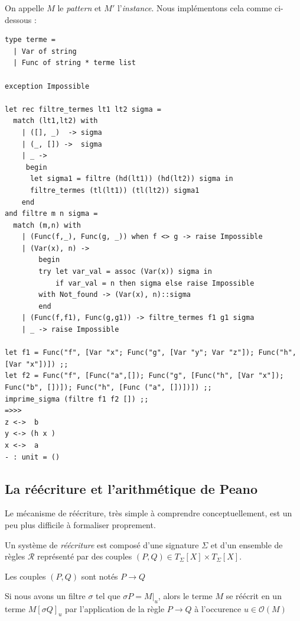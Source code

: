 \documentclass[11pt]{book}
\begin{document}
On appelle $M$ le \textit{pattern} et $M'$ l'\textit{instance}.
Nous implémentons cela comme ci-dessous :
\begin{Verbatim}
type terme = 
  | Var of string
  | Func of string * terme list

exception Impossible

let rec filtre_termes lt1 lt2 sigma =
  match (lt1,lt2) with
    | ([], _)  -> sigma
    | (_, []) ->  sigma
    | _ -> 
     begin
	  let sigma1 = filtre (hd(lt1)) (hd(lt2)) sigma in
	  filtre_termes (tl(lt1)) (tl(lt2)) sigma1
    end 
and filtre m n sigma =
  match (m,n) with
	| (Func(f,_), Func(g, _)) when f <> g -> raise Impossible
	| (Var(x), n) -> 
		begin
		try let var_val = assoc (Var(x)) sigma in
			if var_val = n then sigma else raise Impossible
		with Not_found -> (Var(x), n)::sigma
		end 
	| (Func(f,f1), Func(g,g1)) -> filtre_termes f1 g1 sigma 
	| _ -> raise Impossible

let f1 = Func("f", [Var "x"; Func("g", [Var "y"; Var "z"]); Func("h", [Var "x"])]) ;;
let f2 = Func("f", [Func("a",[]); Func("g", [Func("h", [Var "x"]); Func("b", [])]); Func("h", [Func ("a", [])])]) ;;
imprime_sigma (filtre f1 f2 []) ;;
=>>>
z <->  b 
y <-> (h x )
x <->  a 
- : unit = ()
\end{Verbatim}

\subsection{La réécriture et l'arithmétique de Peano}
Le mécanisme de réécriture, très simple à comprendre conceptuellement, est un peu plus difficile
à formaliser proprement.

Un système de \textit{réécriture} est  composé d'une signature $\Sigma$ et d'un ensemble de règles
$\mathcal{R}$ représenté par des couples $(P,Q) \in T_\Sigma [X] \times  T_\Sigma [X]$.

Les couples $(P,Q)$ sont notés $P \longrightarrow Q$

Si nous avons un filtre $\sigma$ tel que $\sigma P = M|_u$, alors le terme $M$ se 
réécrit en un terme $M[\sigma Q]_u$ par l'application de la règle $P \longrightarrow Q$ 
à l'occurence $u \in \mathcal{O}(M)$  
\begin{center}
\end{center}
\end{document}
